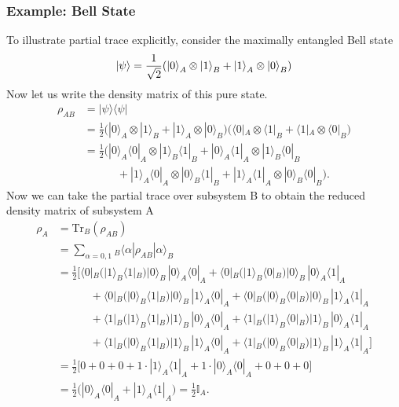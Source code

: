 \documentclass[12pt,oneside,openright]{report}
\theoremstyle{definition}
\theoremstyle{plain}
\theoremstyle{remark}
\begin{document}
\subsubsection{Example: Bell State}
To illustrate partial trace explicitly, consider the maximally entangled Bell state
\begin{equation}
  \ket{\psi} = \frac{1}{\sqrt{2}} (\ket{0}_A \otimes \ket{1}_B + \ket{1}_A \otimes \ket{0}_B)
\end{equation}
Now let us write the density matrix of this pure state.
\begin{align}
\rho_{AB} &= |\psi\rangle\langle\psi| \nonumber\\
&= \frac{1}{2} \big(|0\rangle_A \otimes |1\rangle_B + |1\rangle_A \otimes |0\rangle_B\big)
   \big(\langle 0|_A \otimes \langle 1|_B + \langle 1|_A \otimes \langle 0|_B\big) \nonumber\\
&= \frac{1}{2} \Big(|0\rangle_A\langle 0|_A \otimes |1\rangle_B\langle 1|_B 
   + |0\rangle_A\langle 1|_A \otimes |1\rangle_B\langle 0|_B \nonumber\\
&\qquad\quad + |1\rangle_A\langle 0|_A \otimes |0\rangle_B\langle 1|_B 
   + |1\rangle_A\langle 1|_A \otimes |0\rangle_B\langle 0|_B\Big).
\label{eq:bell_rho_AB}
\end{align}
Now we can take the partial trace over subsystem B to obtain the reduced density matrix of subsystem A
\begin{align}
\rho_A &= \mathrm{Tr}_B(\rho_{AB}) \nonumber\\
&= \sum_{\alpha=0,1} {}_B\langle\alpha| \rho_{AB} |\alpha\rangle_B \nonumber\\
&= \frac{1}{2} \Big[\langle 0|_B\big(|1\rangle_B\langle 1|_B\big)|0\rangle_B \, |0\rangle_A\langle 0|_A 
   + \langle 0|_B\big(|1\rangle_B\langle 0|_B\big)|0\rangle_B \, |0\rangle_A\langle 1|_A \nonumber\\
&\qquad\quad + \langle 0|_B\big(|0\rangle_B\langle 1|_B\big)|0\rangle_B \, |1\rangle_A\langle 0|_A 
   + \langle 0|_B\big(|0\rangle_B\langle 0|_B\big)|0\rangle_B \, |1\rangle_A\langle 1|_A \nonumber\\
&\qquad\quad + \langle 1|_B\big(|1\rangle_B\langle 1|_B\big)|1\rangle_B \, |0\rangle_A\langle 0|_A 
   + \langle 1|_B\big(|1\rangle_B\langle 0|_B\big)|1\rangle_B \, |0\rangle_A\langle 1|_A \nonumber\\
&\qquad\quad + \langle 1|_B\big(|0\rangle_B\langle 1|_B\big)|1\rangle_B \, |1\rangle_A\langle 0|_A 
   + \langle 1|_B\big(|0\rangle_B\langle 0|_B\big)|1\rangle_B \, |1\rangle_A\langle 1|_A\Big] \nonumber\\
&= \frac{1}{2} \Big[0 + 0 + 0 + 1 \cdot |1\rangle_A\langle 1|_A 
   + 1 \cdot |0\rangle_A\langle 0|_A + 0 + 0 + 0\Big] \nonumber\\
&= \frac{1}{2} \big(|0\rangle_A\langle 0|_A + |1\rangle_A\langle 1|_A\big) 
 = \frac{1}{2}\mathbb{I}_A.
\label{eq:bell_reduced}
\end{align}
\end{document}
